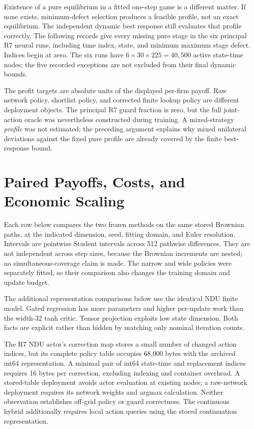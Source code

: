 Existence of a pure equilibrium in a fitted one-step game is a different matter. If none exists, minimum-defect selection produces a feasible profile, not an exact equilibrium. The independent dynamic best response still evaluates that profile correctly. The following records give every missing pure stage in the six principal R7 neural runs, including time index, state, and minimum maximum stage defect. Indices begin at zero. The six runs have $6\times30\times225=40{,}500$ active state-time nodes; the five recorded exceptions are not excluded from their final dynamic bounds.

The profit targets are absolute units of the displayed per-firm payoff. Raw network policy, shortlist policy, and corrected finite lookup policy are different deployment objects. The principal R7 guard fraction is zero, but the full joint-action oracle was nevertheless constructed during training. A mixed-strategy \emph{profile} was not estimated; the preceding argument explains why mixed unilateral deviations against the fixed pure profile are already covered by the finite best-response bound.

\section{Paired Payoffs, Costs, and Economic Scaling}\label{supp:r8-paired}
Each row below compares the two frozen methods on the same stored Brownian paths, at the indicated dimension, seed, fitting domain, and Euler resolution. Intervals are pointwise Student intervals across 512 pathwise differences. They are not independent across step sizes, because the Brownian increments are nested; no simultaneous-coverage claim is made. The narrow and wide policies were separately fitted, so their comparison also changes the training domain and update budget.

The additional representation comparisons below use the identical NDU finite model. Gated regression has more parameters and higher per-update work than the width-32 tanh critic. Tensor projection exploits low state dimension. Both facts are explicit rather than hidden by matching only nominal iteration counts.

The R7 NDU actor's correction map stores a small number of changed action indices, but its complete policy table occupies 68,000 bytes with the archived int64 representation. A minimal pair of int64 state-time and replacement indices requires 16 bytes per correction, excluding indexing and container overhead. A stored-table deployment avoids actor evaluation at existing nodes; a raw-network deployment requires its network weights and argmax calculation. Neither observation establishes off-grid policy or guard correctness. The continuous hybrid additionally requires local action queries using the stored continuation representation.

